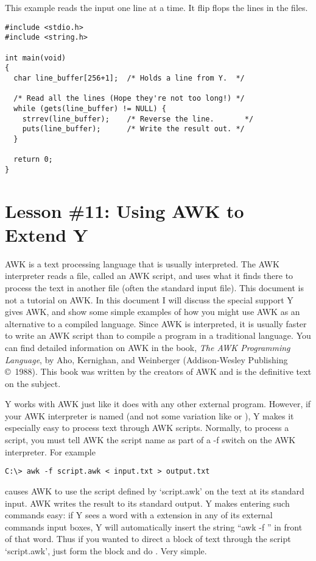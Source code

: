 This example reads the input one line at a time. It flip flops the lines in the files.

\begin{verbatim}
#include <stdio.h>
#include <string.h>

int main(void)
{
  char line_buffer[256+1];  /* Holds a line from Y.  */

  /* Read all the lines (Hope they're not too long!) */
  while (gets(line_buffer) != NULL) {
    strrev(line_buffer);    /* Reverse the line.	   */
    puts(line_buffer);      /* Write the result out. */
  }

  return 0;
}
\end{verbatim}

\section{Lesson \#11: Using AWK to Extend Y}

AWK is a text processing language that is usually interpreted. The AWK interpreter reads a file,
called an AWK script, and uses what it finds there to process the text in another file (often
the standard input file). This document is not a tutorial on AWK. In this document I will
discuss the special support Y gives AWK, and show some simple examples of how you might use AWK
as an alternative to a compiled language. Since AWK is interpreted, it is usually faster to
write an AWK script than to compile a program in a traditional language. You can find detailed
information on AWK in the book, \textit{The AWK Programming Language}, by Aho, Kernighan, and
Weinberger (Addison-Wesley Publishing \copyright\ 1988). This book was written by the creators
of AWK and is the definitive text on the subject.

Y works with AWK just like it does with any other external program. However, if your AWK
interpreter is named  (and not some variation like  or
), Y makes it especially easy to process text through AWK scripts. Normally, to
process a script, you must tell AWK the script name as part of a -f switch on the AWK
interpreter. For example

\begin{verbatim}
C:\> awk -f script.awk < input.txt > output.txt
\end{verbatim}

causes AWK to use the script defined by `script.awk' on the text at its standard input. AWK
writes the result to its standard output. Y makes entering such commands easy: if Y sees a word
with a  extension in any of its external commands input boxes, Y will
automatically insert the string ``awk -f '' in front of that word. Thus if you wanted to direct
a block of text through the script `script.awk', just form the block and do
. Very simple.

